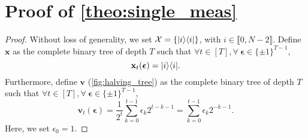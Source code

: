 \section{Proof of \cref{theo:single_meas}}\label{pf:single_meas}

\begin{proof}
    Without loss of generality, we set $\mathcal{X} = \{| i \rangle \langle i |\}$,  with $i\in\llbracket 0,N-2 \rrbracket$. Define $\mathbf{x}$ as the complete binary tree of depth $T$ such that $\forall t\in[T],\forall \ \boldsymbol{\epsilon} \in \{\pm 1\}^{T-1}$,
    \begin{equation}
        \mathbf{x}_t(\boldsymbol{\epsilon}) = | i \rangle \langle i |.
    \end{equation}
    Furthermore, define $\mathbf v$ (\cref{fig:halving_tree}) as the complete binary tree of depth $T$ such that $\forall t\in[T],\forall \ \boldsymbol{\epsilon} \in \{\pm 1\}^{T-1}$,
    \begin{equation}
        \mathbf v_t(\boldsymbol\epsilon)=\frac1{2^t}\sum_{k=0}^{t-1}\epsilon_{k}2^{t-k-1}=\sum_{k=0}^{t-1}\epsilon_{k}2^{-k-1}.
    \end{equation}
    Here, we set $\epsilon_0=1$.


\end{proof}
